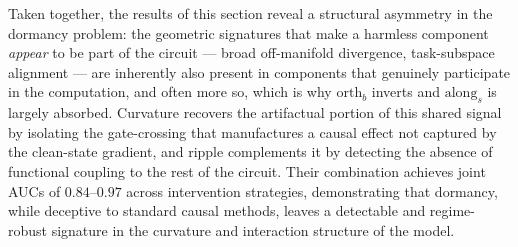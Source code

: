 Taken together, the results of this section reveal a structural asymmetry in the dormancy problem: the geometric signatures that make a harmless component \emph{appear} to be part of the circuit --- broad off-manifold divergence, task-subspace alignment --- are inherently also present in components that genuinely participate in the computation, and often more so, which is why $\mathrm{orth}_b$ inverts and $\mathrm{along}_s$ is largely absorbed. Curvature recovers the artifactual portion of this shared signal by isolating the gate-crossing that manufactures a causal effect not captured by the clean-state gradient, and ripple complements it by detecting the absence of functional coupling to the rest of the circuit. Their combination achieves joint AUCs of $0.84$--$0.97$ across intervention strategies, demonstrating that dormancy, while deceptive to standard causal methods, leaves a detectable and regime-robust signature in the curvature and interaction structure of the model.
